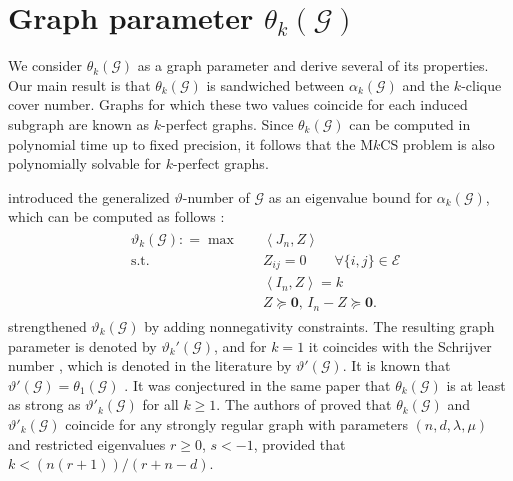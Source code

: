 \documentclass[11pt, a4paper]{article}
\newcommand{\IP}[2]{\left\langle #1, #2 \right\rangle}
\newcommand{\eqdef}{\mathrel{\mathop:}=}
\newcommand{\mc}{\mathcal}
\begin{document}
\section{Graph parameter $\theta_k(\mc{G})$} \label{Sec: Graph parameter}
We consider $\theta_k(\mc{G})$ as a graph parameter and derive several of its properties.
Our main result is that $\theta_k(\mc{G})$ is sandwiched between $\alpha_k(\mc{G})$ and the $k$-clique cover number.
Graphs for which these two values coincide for each induced subgraph are known as $k$-perfect graphs. 
Since $\theta_k(\mc{G})$ can be computed in polynomial time up to fixed precision, it follows that the M$k$CS problem is also polynomially solvable for $k$-perfect graphs.

\citet{Narasimhan1990GenTheta} introduced the generalized $\vartheta$-number of $\mc{G}$ as an eigenvalue bound for $\alpha_k(\mc{G})$, which can be computed as follows \cite{Alizadeh1995SDPGenTheta}:
\begin{align} \tag{$ \vartheta_k$} \label{generalizedTheta} &
\begin{aligned}
    \vartheta_k(\mc{G}) \eqdef
     \max \quad & \IP{J_n}{Z}  \\
    \text{s.t.} \quad & Z_{ij}=0  \qquad \forall \{i,j\} \in \mc{E}  \\
    &  \IP{I_n}{Z} =k \\
    & Z \succeq \mathbf{0}, \, I_n-Z\succeq \mathbf{0}.
\end{aligned} 
\end{align}    
\citet{Kuryatnikova2022MkCSProblem} strengthened $\vartheta_k(\mc{G})$ by adding nonnegativity constraints.
The resulting graph parameter is denoted by  $\vartheta_k'(\mc{G})$, and for $k=1$ it coincides with the Schrijver number {\cite{Schrijver1979}}, which is denoted in the literature by $\vartheta'(\mc{G})$. 
It is known that  $\vartheta'(\mc{G})=\theta_1(\mc{G})$ \cite{Kuryatnikova2022MkCSProblem}.
It was conjectured in the same paper that $\theta_k(\mc{G})$ is at least as strong as  $\vartheta'_k(\mc{G})$ for all $k\geq 1$.
The authors of \cite{Sinjorgo2022GenVartheta} proved that $\theta_k(\mc{G})$ and $\vartheta'_k(\mc{G})$ coincide for any strongly regular graph with parameters $(n,d,\lambda,\mu)$ and restricted eigenvalues $r\geq0$, $s<-1$, provided that $k < (n(r+1))/(r+n-d)$. 
\end{document}
